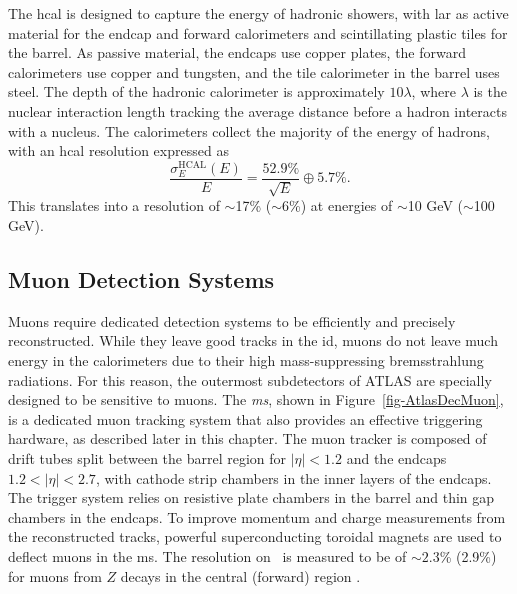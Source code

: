 The \gls{hcal} is designed to capture the energy of hadronic showers, with \gls{lar} as active material for the endcap and forward calorimeters and scintillating plastic tiles for the barrel. As passive material, the endcaps use copper plates, the forward calorimeters use copper and tungsten, and the tile calorimeter in the barrel uses steel. The depth of the hadronic calorimeter is approximately $10 \lambda$, where $\lambda$ is the nuclear interaction length tracking the average distance before a hadron interacts with a nucleus. The calorimeters collect the majority of the energy of hadrons, with an \gls{hcal} resolution expressed as \cite{Cavallari_2011}
\begin{equation}
  \frac{\sigma_E^{\text{HCAL}}(E)}{E} = \frac{52.9\%}{\sqrt{E}} \oplus 5.7\%.
\end{equation}
This translates into a resolution of $\sim$17\% ($\sim$6\%) at energies of $\sim$10 GeV ($\sim$100 GeV).

\subsection{Muon Detection Systems}
Muons require dedicated detection systems to be efficiently and precisely reconstructed. While they leave good tracks in the \gls{id}, muons do not leave much energy in the calorimeters due to their high mass-suppressing bremsstrahlung radiations. For this reason, the outermost subdetectors of ATLAS are specially designed to be sensitive to muons. The \textit{\gls{ms}}, shown in Figure~\ref{fig-AtlasDecMuon}, is a dedicated muon tracking system that also provides an effective triggering hardware, as described later in this chapter. The muon tracker is composed of drift tubes split between the barrel region for $|\eta| < 1.2$ and the endcaps $1.2 < |\eta| < 2.7$, with cathode strip chambers in the inner layers of the endcaps. The trigger system relies on resistive plate chambers in the barrel and thin gap chambers in the endcaps. To improve momentum and charge measurements from the reconstructed tracks, powerful superconducting toroidal magnets are used to deflect muons in the \gls{ms}. The resolution on \pt\ is measured to be of $\sim 2.3$\% (2.9\%) for muons from $Z$ decays in the central (forward) region \cite{atlasMuonPTReco}.

